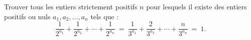 Trouver tous les entiers strictement positifs $n$ pour lesquels il existe des entiers positifs ou nuls
$a_1, a_2, \ldots, a_n$ tels que :
\[
\frac{1}{2^{a_1}} + \frac{1}{2^{a_2}} + \cdots + \frac{1}{2^{a_n}} \ = \ \frac{1}{3^{a_1}} + \frac{2}{3^{a_2}} + \cdots + \frac{n}{3^{a_n}} \ = \ 1.
\]
